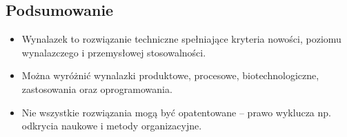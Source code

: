 \subsection{Podsumowanie}
\begin{itemize}
    \item Wynalazek to rozwiązanie techniczne spełniające kryteria nowości, poziomu wynalazczego i przemysłowej stosowalności.
    \item Można wyróżnić wynalazki produktowe, procesowe, biotechnologiczne, zastosowania oraz oprogramowania.
    \item Nie wszystkie rozwiązania mogą być opatentowane – prawo wyklucza np. odkrycia naukowe i metody organizacyjne.
\end{itemize}
